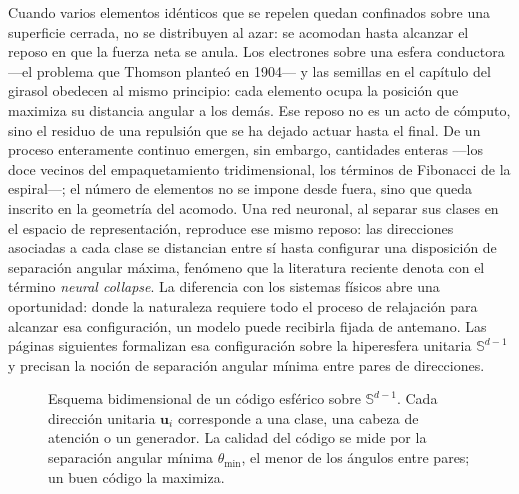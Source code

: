 \documentclass[11pt,a4paper]{article}
\theoremstyle{plain}
\newcommand{\Sph}{\mathbb{S}}
\begin{document}
Cuando varios elementos idénticos que se repelen quedan confinados sobre
una superficie cerrada, no se distribuyen al azar: se acomodan hasta
alcanzar el reposo en que la fuerza neta se anula. Los electrones sobre
una esfera conductora ---el problema que Thomson planteó en 1904--- y las
semillas en el capítulo del girasol obedecen al mismo principio: cada
elemento ocupa la posición que maximiza su distancia angular a los
demás. Ese reposo no es un acto de cómputo, sino el residuo de una
repulsión que se ha dejado actuar hasta el final. De un proceso
enteramente continuo emergen, sin embargo, cantidades enteras ---los doce
vecinos del empaquetamiento tridimensional, los términos de Fibonacci de
la espiral---; el número de elementos no se impone desde fuera, sino que
queda inscrito en la geometría del acomodo. Una red neuronal, al separar
sus clases en el espacio de representación, reproduce ese mismo reposo:
las direcciones asociadas a cada clase se distancian entre sí hasta
configurar una disposición de separación angular máxima, fenómeno que la
literatura reciente denota con el término \emph{neural collapse}. La
diferencia con los sistemas físicos abre una oportunidad: donde la
naturaleza requiere todo el proceso de relajación para alcanzar esa
configuración, un modelo puede recibirla fijada de antemano. Las páginas
siguientes formalizan esa configuración sobre la hiperesfera unitaria
$\Sph^{d-1}$ y precisan la noción de separación angular mínima entre
pares de direcciones.

\begin{figure}[t]
\centering
{}
\caption{Esquema bidimensional de un código esférico sobre
$\Sph^{d-1}$. Cada dirección unitaria $\bm{u}_i$ corresponde a una
clase, una cabeza de atención o un generador. La calidad del código se
mide por la separación angular mínima $\theta_{\min}$, el menor de los
ángulos entre pares; un buen código la maximiza.}
\label{fig:sphere}
\end{figure}
\end{document}
